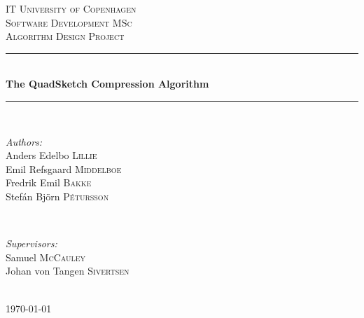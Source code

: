 \documentclass{article}
\newcommand{\qs}{\texttt{QuadSketch}}
\begin{document}

\begin{titlepage}
	
	\newcommand{\HRule}{\rule{\linewidth}{0.5mm}} %
	
	\center %
	
	\textsc{\LARGE IT University of Copenhagen}\\[1.5cm] %
	\textsc{\Large Software Development MSc}\\[0.5cm] %
	\textsc{\large Algorithm Design Project}\\[0.5cm] %
	
	\HRule \\[0.4cm]
	{ \huge \bfseries The QuadSketch Compression Algorithm}\\[0.4cm] %
	\HRule \\[1.5cm]
	
	\begin{minipage}{0.5\textwidth}
		\begin{flushleft} \large
			\emph{Authors:}\\
			Anders Edelbo \textsc{Lillie} \\
			Emil Refsgaard \textsc{Middelboe} \\
			Fredrik Emil \textsc{Bakke} \\
			Stefán Björn \textsc{Pétursson}
		\end{flushleft}
	\end{minipage}
	~
	\begin{minipage}{0.4\textwidth}
		\begin{flushright} \large
			\emph{Supervisors:} \\
			Samuel \textsc{McCauley} \\
			Johan von Tangen \textsc{Sivertsen}
		\end{flushright}
	\end{minipage}\\[4cm]
	
	{\large \today}\\[3cm] 
	
	\vfill %
	
\end{titlepage}

\begin{abstract}
This paper analyzes, experiment, and verifies the relatively new algorithm \qs{} proposed in \cite{wagner17} and makes a contribution by \dots The original complexity is stated as such, and with the developed heuristics, a new complexity for this particular data set is found to be \dots A baseline algorithm has been implemented to properly verify the experiments and results from \cite{wagner17}, which turns out that \dots Furthermore \qs{} has been tested on a new type of data set, "NAME", which reveals that \dots
\end{abstract}
\clearpage
\end{document}
